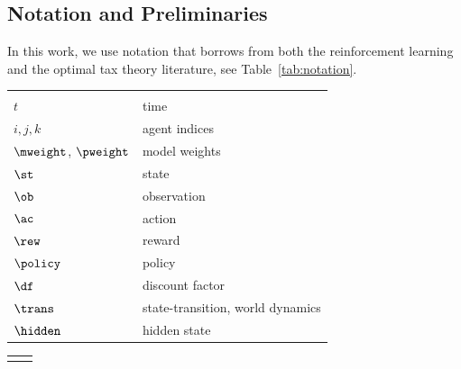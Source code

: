 \subsection{Notation and Preliminaries}
\label{sect:econgames}

In this work, we use notation that borrows from both the reinforcement learning and the optimal tax theory literature, see Table~\ref{tab:notation}.

\begin{table}[h!]
    \begin{minipage}[t]{0.48\linewidth}
        \begin{small}
            \begin{center}
                \begin{tabular}[c]{ll}
                    \multicolumn{1}{c}{\textbf{}} &
                    \multicolumn{1}{c}{\textbf{}} \\
                    $t$ & time \\
                    $i,j,k$ & agent indices \\
                    \hline
                    $\mweight$, $\pweight$ & model weights \\
                    \hline
                    $\st$ & state \\
                    $\ob$ & observation \\
                    $\ac$ & action \\
                    $\rew$ & reward \\
                    $\policy$ & policy \\
                    $\df$ & discount factor \\
                    $\trans$ & state-transition, world dynamics \\
                    \hline
                    $\hidden$ & hidden state
                \end{tabular}
                \label{tab:notation_rl}
            \end{center}
        \end{small}
    \end{minipage}
    \begin{minipage}[t]{0.48\linewidth}
        \begin{small}
            \begin{center}
                \begin{tabular}[c]{ll}
                    \multicolumn{1}{c}{\textbf{}} &
                    \multicolumn{1}{c}{\textbf{}} \\

\end{tabular}
\end{center}
\end{small}
\end{minipage}
\end{table}
